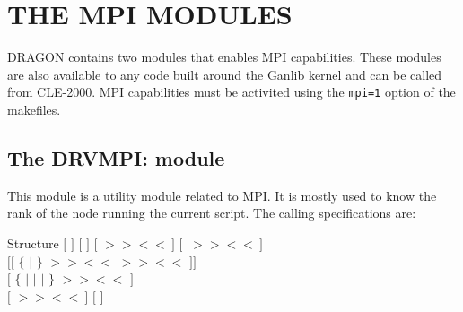 \section{THE MPI MODULES}\label{sect:MPIModuleInput}

DRAGON contains two modules that enables MPI capabilities. These modules are also available to any code built
around the Ganlib kernel and can be called from CLE-2000.\cite{ganlib5,cle2000} MPI capabilities must be
activited using the {\tt mpi=1} option of the makefiles.

\subsection{The DRVMPI: module}\label{sect:DRVMPIData}

This module is a utility module related to MPI. It is mostly used to know the rank of the node running the current script. The calling specifications are:

\begin{DataStructure}{Structure }
$[$  \moc{:=} $]$  \moc{::} $[$   $]$ $[$  $>>$$<<~]$ $[~$ $>>$$<<~]$ \\ $[[$  $\{$  $|$  $\}$  $>>$$<<$ $>>$$<<$ $]]$ \\ $[$  $\{$  $|$  $|$  $|$  $\}$  $>>$$<<$ $]$ \\ $[$  $>>$$<<~]$ $[$  $]$ \moc{;} \\
\end{DataStructure}

